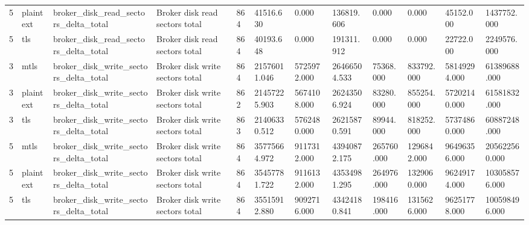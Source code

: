 \begin{longtable}{llllllllllll}
5 & plaintext & broker\_disk\_read\_sectors\_delta\_total & Broker disk read sectors total & 864 & 41516.630 & 0.000 & 136819.606 & 0.000 & 0.000 & 45152.000 & 1437752.000 \\
5 & tls & broker\_disk\_read\_sectors\_delta\_total & Broker disk read sectors total & 864 & 40193.648 & 0.000 & 191311.912 & 0.000 & 0.000 & 22722.000 & 2249576.000 \\
3 & mtls & broker\_disk\_write\_sectors\_delta\_total & Broker disk write sectors total & 864 & 21576011.046 & 5725972.000 & 26466504.533 & 75368.000 & 833792.000 & 58149294.000 & 61389688.000 \\
3 & plaintext & broker\_disk\_write\_sectors\_delta\_total & Broker disk write sectors total & 862 & 21457225.903 & 5674108.000 & 26243506.924 & 83280.000 & 855254.000 & 57202140.000 & 61581832.000 \\
3 & tls & broker\_disk\_write\_sectors\_delta\_total & Broker disk write sectors total & 863 & 21406330.512 & 5762480.000 & 26215870.591 & 89944.000 & 818252.000 & 57374860.000 & 60887248.000 \\
5 & mtls & broker\_disk\_write\_sectors\_delta\_total & Broker disk write sectors total & 864 & 35775664.972 & 9117312.000 & 43940872.175 & 265760.000 & 1296842.000 & 96496356.000 & 205622560.000 \\
5 & plaintext & broker\_disk\_write\_sectors\_delta\_total & Broker disk write sectors total & 864 & 35457781.722 & 9116132.000 & 43534981.295 & 264976.000 & 1329060.000 & 96249174.000 & 103058576.000 \\
5 & tls & broker\_disk\_write\_sectors\_delta\_total & Broker disk write sectors total & 864 & 35515912.880 & 9092716.000 & 43424180.841 & 198416.000 & 1315626.000 & 96251778.000 & 100598496.000 \\
\hline
\end{longtable}
